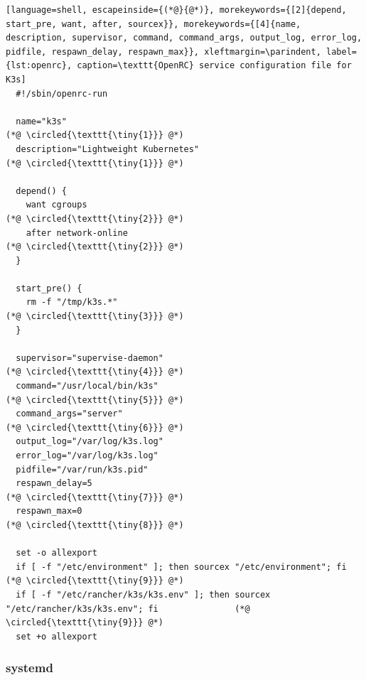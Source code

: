 \begin{lstlisting}[language=shell, escapeinside={(*@}{@*)}, morekeywords={[2]{depend, start_pre, want, after, sourcex}}, morekeywords={[4]{name, description, supervisor, command, command_args, output_log, error_log, pidfile, respawn_delay, respawn_max}}, xleftmargin=\parindent, label={lst:openrc}, caption=\texttt{OpenRC} service configuration file for K3s]
  #!/sbin/openrc-run

  name="k3s"                                                                                      (*@ \circled{\texttt{\tiny{1}}} @*)
  description="Lightweight Kubernetes"                                                            (*@ \circled{\texttt{\tiny{1}}} @*)

  depend() {
    want cgroups                                                                                  (*@ \circled{\texttt{\tiny{2}}} @*)
    after network-online                                                                          (*@ \circled{\texttt{\tiny{2}}} @*)
  }

  start_pre() {
    rm -f "/tmp/k3s.*"                                                                            (*@ \circled{\texttt{\tiny{3}}} @*)
  }

  supervisor="supervise-daemon"                                                                   (*@ \circled{\texttt{\tiny{4}}} @*)
  command="/usr/local/bin/k3s"                                                                    (*@ \circled{\texttt{\tiny{5}}} @*)
  command_args="server"                                                                           (*@ \circled{\texttt{\tiny{6}}} @*)
  output_log="/var/log/k3s.log"
  error_log="/var/log/k3s.log"
  pidfile="/var/run/k3s.pid"
  respawn_delay=5                                                                                 (*@ \circled{\texttt{\tiny{7}}} @*)
  respawn_max=0                                                                                   (*@ \circled{\texttt{\tiny{8}}} @*)

  set -o allexport
  if [ -f "/etc/environment" ]; then sourcex "/etc/environment"; fi                               (*@ \circled{\texttt{\tiny{9}}} @*)
  if [ -f "/etc/rancher/k3s/k3s.env" ]; then sourcex "/etc/rancher/k3s/k3s.env"; fi               (*@ \circled{\texttt{\tiny{9}}} @*)
  set +o allexport
\end{lstlisting}

\subsubsection{systemd}
\label{subsec:implementation_distributions_init_system_systemd}

